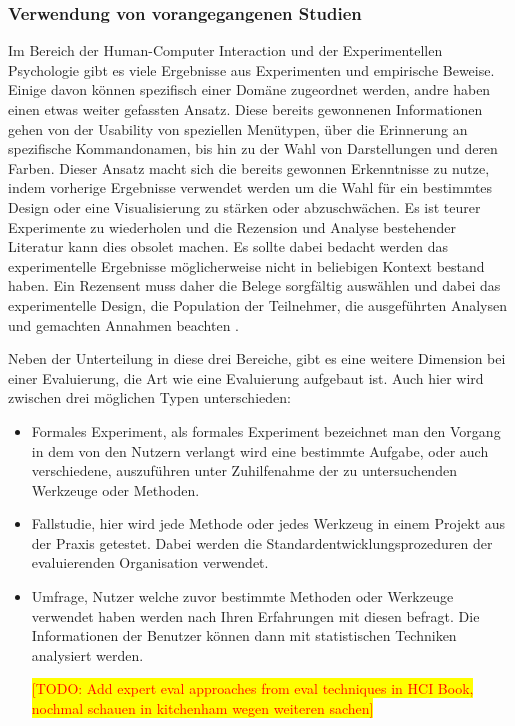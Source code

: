 \documentclass[draft=false
              ,paper=a4
              ,twoside=false
              ,fontsize=11pt
              ,headsepline
              ,BCOR10mm
              ,DIV11
              ]{scrbook}
\newcommand{\TODO}[1]{\colorbox{yellow}{\textcolor{red}{[TODO: #1]}}}
\begin{document}
\subsubsection{Verwendung von vorangegangenen Studien} %
\label{ssub:verwendung_von_vorangegangenen_studien}
Im Bereich der Human-Computer Interaction und der Experimentellen Psychologie gibt es viele Ergebnisse aus Experimenten und empirische Beweise. Einige davon können spezifisch einer Domäne zugeordnet werden, andre haben einen etwas weiter gefassten Ansatz. Diese bereits gewonnenen Informationen gehen von der Usability von speziellen Menütypen, über die Erinnerung an spezifische Kommandonamen, bis hin zu der Wahl von Darstellungen und deren Farben.
Dieser Ansatz macht sich die bereits gewonnen Erkenntnisse zu nutze, indem vorherige Ergebnisse verwendet werden um die Wahl für ein bestimmtes Design oder eine Visualisierung zu stärken oder abzuschwächen. Es ist teurer Experimente zu wiederholen und die Rezension und Analyse bestehender Literatur kann dies obsolet machen. Es sollte dabei bedacht werden das experimentelle Ergebnisse möglicherweise nicht in beliebigen Kontext bestand haben. Ein Rezensent muss daher die Belege sorgfältig auswählen und dabei das experimentelle Design, die Population der Teilnehmer, die ausgeführten Analysen und gemachten Annahmen beachten \cite{alan_dix_human-computer_2004}. 

\iffalse%
Neben der Unterteilung in diese drei Bereiche, gibt es eine weitere Dimension bei einer Evaluierung, die Art wie eine Evaluierung aufgebaut ist. Auch hier wird zwischen drei möglichen Typen unterschieden:

\begin{itemize}
  \item Formales Experiment, als formales Experiment bezeichnet man den Vorgang in dem von den Nutzern verlangt wird eine bestimmte Aufgabe, oder auch verschiedene, auszuführen unter Zuhilfenahme der zu untersuchenden Werkzeuge oder Methoden. 
  \item Fallstudie, hier wird jede Methode oder jedes Werkzeug in einem Projekt aus der Praxis getestet. Dabei werden die Standardentwicklungsprozeduren der evaluierenden Organisation verwendet.
  \item Umfrage, Nutzer welche zuvor bestimmte Methoden oder Werkzeuge verwendet haben werden nach Ihren Erfahrungen mit diesen befragt. Die Informationen der Benutzer können dann mit statistischen Techniken analysiert werden. 

  \TODO{Add expert eval approaches from eval techniques in HCI Book, nochmal schauen in kitchenham wegen weiteren sachen}
\end{itemize}
\end{document}
